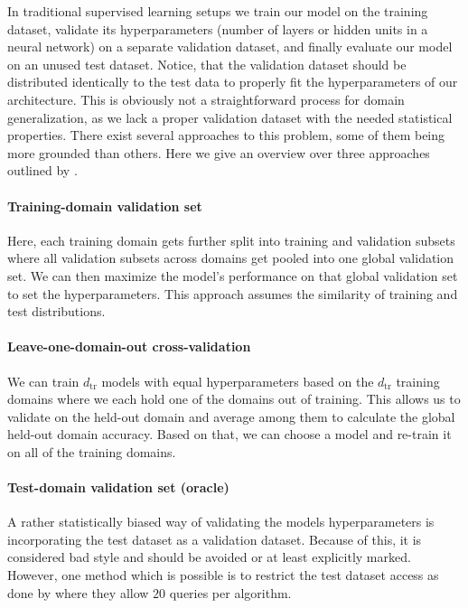 In traditional supervised learning setups we train our model on the training dataset, validate its hyperparameters (\eg number of layers or hidden units in a neural network) on a separate validation dataset, and finally evaluate our model on an unused test dataset. Notice, that the validation dataset should be distributed identically to the test data to properly fit the hyperparameters of our architecture. This is obviously not a straightforward process for domain generalization, as we lack a proper validation dataset with the needed statistical properties. There exist several approaches to this problem, some of them being more grounded than others. Here we give an overview over three approaches outlined by \citet{gulrajani2020search}. 

\paragraph{Training-domain validation set} 
Here, each training domain gets further split into training and validation subsets where all validation subsets across domains get pooled into one global validation set. We can then maximize the model's performance on that global validation set to set the hyperparameters. This approach assumes the similarity of training and test distributions.

\paragraph{Leave-one-domain-out cross-validation}
We can train $d_{\mathrm{tr}}$ models with equal hyperparameters based on the $d_{\mathrm{tr}}$ training domains where we each hold one of the domains out of training. This allows us to validate on the held-out domain and average among them to calculate the global held-out domain accuracy. Based on that, we can choose a model and re-train it on all of the training domains. 

\paragraph{Test-domain validation set (oracle)}
A rather statistically biased way of validating the models hyperparameters is incorporating the test dataset as a validation dataset. Because of this, it is considered bad style and should be avoided or at least explicitly marked. However, one method which is possible is to restrict the test dataset access as done by \citet{gulrajani2020search} where they allow $20$ queries per algorithm.   

